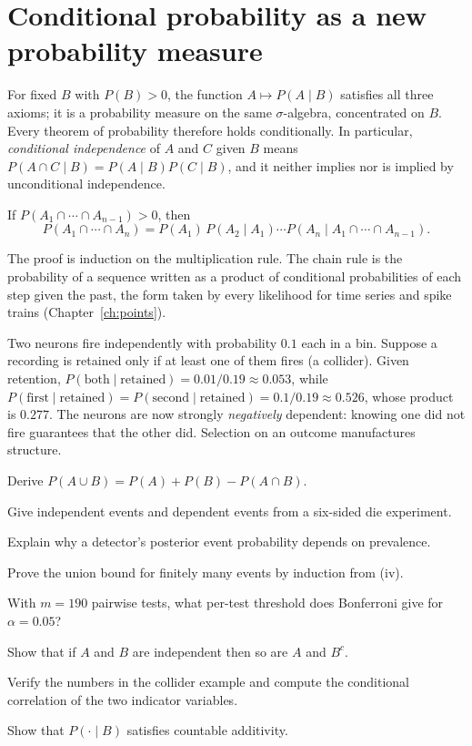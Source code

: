 \section{Conditional probability as a new probability measure}
For fixed $B$ with $P(B)>0$, the function $A\mapsto P(A\mid B)$ satisfies all three axioms; it is a probability measure on the same $\sigma$-algebra, concentrated on $B$. Every theorem of probability therefore holds conditionally. In particular, \emph{conditional independence} of $A$ and $C$ given $B$ means $P(A\cap C\mid B)=P(A\mid B)P(C\mid B)$, and it neither implies nor is implied by unconditional independence.

\begin{proposition}
If $P(A_1\cap\cdots\cap A_{n-1})>0$, then
\[
P(A_1\cap\cdots\cap A_n)=P(A_1)\,P(A_2\mid A_1)\cdots P(A_n\mid A_1\cap\cdots\cap A_{n-1}).
\]
\end{proposition}
The proof is induction on the multiplication rule. The chain rule is the probability of a sequence written as a product of conditional probabilities of each step given the past, the form taken by every likelihood for time series and spike trains (Chapter~\ref{ch:points}).

\begin{workedexample}
Two neurons fire independently with probability $0.1$ each in a bin. Suppose a recording is retained only if at least one of them fires (a collider). Given retention, $P(\text{both}\mid\text{retained})=0.01/0.19\approx0.053$, while $P(\text{first}\mid\text{retained})=P(\text{second}\mid\text{retained})=0.1/0.19\approx0.526$, whose product is $0.277$. The neurons are now strongly \emph{negatively} dependent: knowing one did not fire guarantees that the other did. Selection on an outcome manufactures structure.
\end{workedexample}
\begin{exercises}
\item Derive $P(A\cup B)=P(A)+P(B)-P(A\cap B)$.
\item Give independent events and dependent events from a six-sided die experiment.
\item Explain why a detector's posterior event probability depends on prevalence.
\item Prove the union bound for finitely many events by induction from (iv).
\item With $m=190$ pairwise tests, what per-test threshold does Bonferroni give for $\alpha=0.05$?
\item Show that if $A$ and $B$ are independent then so are $A$ and $B^c$.
\item Verify the numbers in the collider example and compute the conditional correlation of the two indicator variables.
\item Show that $P(\cdot\mid B)$ satisfies countable additivity.
\end{exercises}
